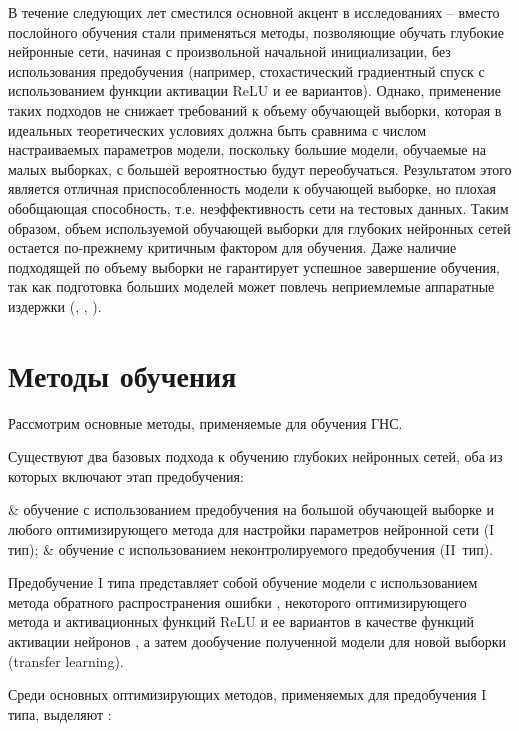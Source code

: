 В течение следующих лет сместился основной акцент в исследованиях -- вместо послойного обучения стали применяться методы, позволяющие обучать глубокие нейронные сети, начиная с произвольной начальной инициализации, без использования предобучения (например, стохастический градиентный спуск с использованием функции активации ReLU и ее вариантов). Однако, применение таких подходов не снижает требований к объему обучающей выборки, которая в идеальных теоретических условиях должна быть сравнима с числом настраиваемых параметров модели, поскольку большие модели, обучаемые на малых выборках, с большей вероятностью будут переобучаться. Результатом этого является отличная приспособленность модели к обучающей выборке, но плохая обобщающая способность, т.е. неэффективность сети на тестовых данных. Таким образом, объем используемой обучающей выборки для глубоких нейронных сетей остается по-прежнему критичным фактором для обучения. Даже наличие подходящей по объему выборки не гарантирует успешное завершение обучения, так как подготовка больших моделей может повлечь неприемлемые аппаратные издержки (\cite{alpaca2023}, \cite{alpacagithub}, \cite{zhang2022opt}).

\section{Методы обучения}

Рассмотрим основные методы, применяемые для обучения ГНС.

Существуют два базовых подхода к обучению глубоких нейронных сетей, оба из которых включают этап предобучения:

\begin{easylistNum}    
    & обучение с использованием предобучения на большой обучающей выборке и любого оптимизирующего метода для настройки параметров нейронной сети (I тип);
	& обучение с использованием неконтролируемого предобучения (II~тип).
\end{easylistNum}

Предобучение I типа представляет собой обучение модели с использованием метода обратного распространения ошибки \cite{Glorot2011}, некоторого оптимизирующего метода и активационных функций ReLU и ее вариантов в качестве функций активации нейронов \cite{LeCun2015}, а затем дообучение полученной модели для новой выборки (transfer learning). 

Среди основных оптимизирующих методов, применяемых для предобучения I типа, выделяют \cite{Goodfellow2017}:

